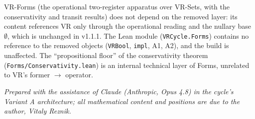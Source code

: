 \documentclass[11pt]{article}
\begin{document}
VR-Forms (the operational two-register apparatus over VR-Sets, with the conservativity and transit
results) does not depend on the removed layer: its content references VR only through the operational
reading and the nullary base $\emptyset$, which is unchanged in v1.1.1. The Lean module
(\texttt{VRCycle.Forms}) contains no reference to the removed objects (\texttt{VRBool},
\texttt{impl}, A1, A2), and the build is unaffected. The ``propositional floor'' of the conservativity
theorem (\texttt{Forms/Conservativity.lean}) is an internal technical layer of Forms, unrelated to
VR's former $\to$ operator.

\vfill
\noindent\emph{Prepared with the assistance of Claude (Anthropic, Opus 4.8) in the cycle's Variant A
architecture; all mathematical content and positions are due to the author, Vitaly Reznik.}
\end{document}
